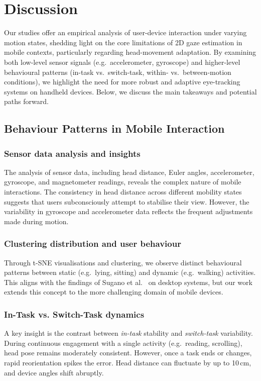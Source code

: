 \section{Discussion}\label{sec:discussion}
Our studies offer an empirical analysis of user-device interaction under varying motion states, shedding light on the core limitations of 2D gaze estimation in mobile contexts, particularly regarding head-movement adaptation. By examining both low-level sensor signals (e.g.\ accelerometer, gyroscope) and higher-level behavioural patterns (in-task vs.\ switch-task, within- vs.\ between-motion conditions), we highlight the need for more robust and adaptive eye-tracking systems on handheld devices. Below, we discuss the main takeaways and potential paths forward.


\subsection{Behaviour Patterns in Mobile Interaction}

\subsubsection{Sensor data analysis and insights}
The analysis of sensor data, including head distance, Euler angles, accelerometer, gyroscope, and magnetometer readings, reveals the complex nature of mobile interactions. The consistency in head distance across different mobility states suggests that users subconsciously attempt to stabilise their view. However, the variability in gyroscope and accelerometer data reflects the frequent adjustments made during motion.


\subsubsection{Clustering distribution and user behaviour}
Through t-SNE visualisations and clustering, we observe distinct behavioural patterns between static (e.g.\ lying, sitting) and dynamic (e.g.\ walking) activities. This aligns with the findings of Sugano et al.~\cite{Sugano08Incremental} on desktop systems, but our work extends this concept to the more challenging domain of mobile devices. 


\subsubsection{In-Task vs. Switch-Task dynamics}
A key insight is the contrast between \emph{in-task} stability and \emph{switch-task} variability. During continuous engagement with a single activity (e.g.\ reading, scrolling), head pose remains moderately consistent. However, once a task ends or changes, rapid reorientation spikes the error. Head distance can fluctuate by up to 10\,cm, and device angles shift abruptly.


